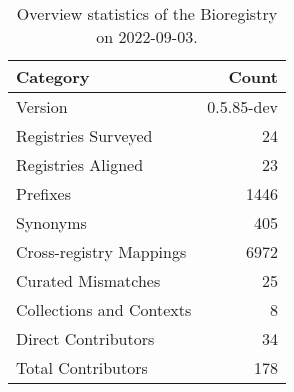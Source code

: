 \begin{table}
\centering
\caption{Overview statistics of the Bioregistry on 2022-09-03.}
\label{tab:bioregistry-summary}
\begin{tabular}{lr}
\toprule
                Category &      Count \\
\midrule
                 Version & 0.5.85-dev \\
     Registries Surveyed &         24 \\
      Registries Aligned &         23 \\
                Prefixes &       1446 \\
                Synonyms &        405 \\
 Cross-registry Mappings &       6972 \\
      Curated Mismatches &         25 \\
Collections and Contexts &          8 \\
     Direct Contributors &         34 \\
      Total Contributors &        178 \\
\bottomrule
\end{tabular}
\end{table}
